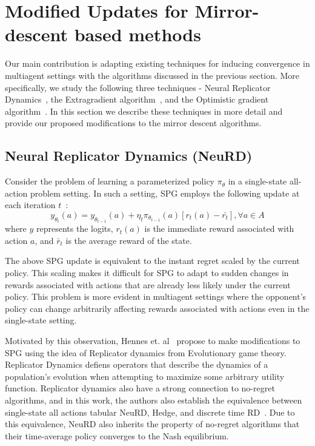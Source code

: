 \chapter{Modified Updates for Mirror-descent based methods}
\label{chp:updates}

Our main contribution is adapting existing techniques for inducing convergence in multiagent
settings with the algorithms discussed in the previous section.
More specifically, we study the following three techniques - Neural Replicator
Dynamics~\cite{hennesNeural2020}, the Extragradient algorithm~\cite{korpelevichextragradient1976},
and the Optimistic gradient algorithm~\cite{popovmodification1980}.
In this section we describe these techniques in more detail and provide our proposed modifications
to the mirror descent algorithms.

\section{Neural Replicator Dynamics (NeuRD)}


Consider the problem of learning a parameterized policy $\pi_{\theta}$ in a single-state all-action
problem setting.
In such a setting, SPG employs the following update at each iteration
$t$~\cite[Section~A.1]{hennesNeural2020}: \[y_{\theta_t}(a) = y_{\theta_{t-1}} (a) + \eta_t
	\pi_{\theta_{t-1}}(a) [r_t(a) - \bar{r_t}], \forall a \in A\] where $y$ represents the logits,
$r_t(a)$ is the immediate reward associated with action $a$, and $\bar{r}_t$ is the average reward
of the state.

The above SPG update is equivalent to the instant regret scaled by the current policy.
This scaling makes it difficult for SPG to adapt to sudden changes in rewards associated with
actions that are already less likely under the current policy.
This problem is more evident in multiagent settings where the opponent's policy can change
arbitrarily affecting rewards associated with actions even in the single-state setting.

Motivated by this observation, Hennes et. al~\cite{hennesNeural2020} propose to make modifications
to SPG using the idea of Replicator dynamics from Evolutionary game theory.
Replicator Dynamics defiens operators that describe the dynamics of a population's evolution when
attempting to maximize some arbitrary utility function.
Replicator dynamics also have a strong connection to no-regret algorithms, and in this work, the
authors also establish the equivalence between single-state all actions tabular NeuRD, Hedge, and
discrete time RD~\cite[Statement 1, p5]{hennesNeural2020}.
Due to this equivalence, NeuRD also inherits the property of no-regret algorithms that their
time-average policy converges to the Nash equilibrium.

